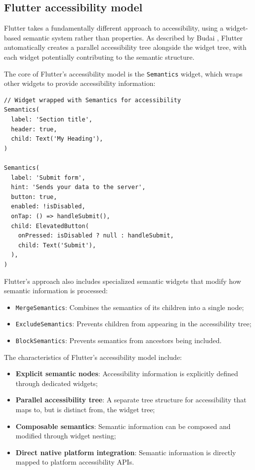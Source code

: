 \subsection{Flutter accessibility model}
Flutter takes a fundamentally different approach to accessibility, using a widget-based semantic system rather than properties. As described by Budai \cite{budai2024mobile}, Flutter automatically creates a parallel accessibility tree alongside the widget tree, with each widget potentially contributing to the semantic structure.

The core of Flutter's accessibility model is the \texttt{Semantics} widget, which wraps other widgets to provide accessibility information:

\begin{lstlisting}[style=DartStyle, caption=Flutter Semantics widget system]
// Widget wrapped with Semantics for accessibility
Semantics(
  label: 'Section title',
  header: true,
  child: Text('My Heading'),
)

Semantics(
  label: 'Submit form',
  hint: 'Sends your data to the server',
  button: true,
  enabled: !isDisabled,
  onTap: () => handleSubmit(),
  child: ElevatedButton(
    onPressed: isDisabled ? null : handleSubmit,
    child: Text('Submit'),
  ),
)
\end{lstlisting}

Flutter's approach also includes specialized semantic widgets that modify how semantic information is processed:

\begin{itemize}
    \item \texttt{MergeSemantics}: Combines the semantics of its children into a single node;
    \item \texttt{ExcludeSemantics}: Prevents children from appearing in the accessibility tree;
    \item \texttt{BlockSemantics}: Prevents semantics from ancestors being included.
\end{itemize}

The characteristics of Flutter's accessibility model include:

\begin{itemize}
    \item \textbf{Explicit semantic nodes}: Accessibility information is explicitly defined through dedicated widgets;
    \item \textbf{Parallel accessibility tree}: A separate tree structure for accessibility that maps to, but is distinct from, the widget tree;
    \item \textbf{Composable semantics}: Semantic information can be composed and modified through widget nesting;
    \item \textbf{Direct native platform integration}: Semantic information is directly mapped to platform accessibility APIs.
\end{itemize}

